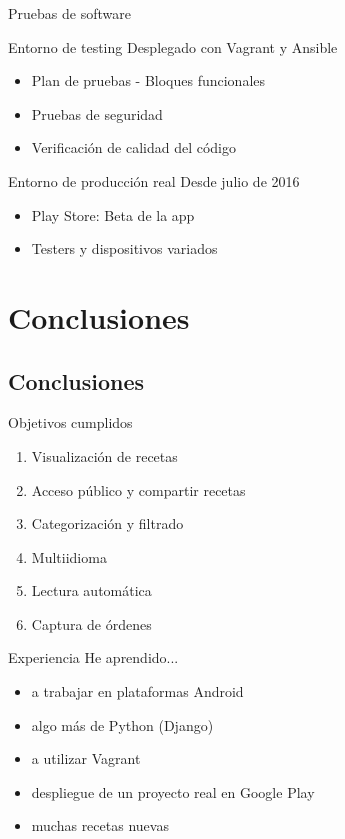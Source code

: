 \documentclass[10pt,xcolor=svgnames]{beamer}
\begin{document}
\begin{frame}{Pruebas de software}

  \begin{block}{Entorno de testing}
    Desplegado con Vagrant y Ansible
    
    \begin{itemize}
    \item Plan de pruebas - Bloques funcionales
    \item Pruebas de seguridad
    \item Verificación de calidad del código
    \end{itemize}
  \end{block}
      
  \begin{block}{Entorno de producción real}
    Desde julio de 2016
    \begin{itemize}
    \item Play Store: Beta de la app
    \item Testers y dispositivos variados
    \end{itemize}
  \end{block}
  
\end{frame}



\section{Conclusiones}

\subsection{Conclusiones}

\begin{frame}{Objetivos cumplidos}
  \begin{enumerate}
  \item Visualización de recetas
  \item Acceso público y compartir recetas
  \item Categorización y filtrado
  \item Multiidioma
  \item Lectura automática
  \item Captura de órdenes
  \end{enumerate}  
  
\end{frame}


\begin{frame}{Experiencia}
  He aprendido...
  \begin{itemize}
  \item a trabajar en plataformas Android
  \item algo más de Python (Django)
  \item a utilizar Vagrant
  \item despliegue de un proyecto real en Google Play
  \item muchas recetas nuevas
  \end{itemize}
\end{frame}  
\end{document}
